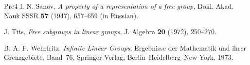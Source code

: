\documentclass{article}
\theoremstyle{definition}
\begin{document}
\begin{thebibliography}{Pre4}
I. N. Sanov,
\emph{A property of a representation of a free group},
Dokl. Akad. Nauk SSSR \textbf{57} (1947), 657--659 (in Russian).

J. Tits,
\emph{Free subgroups in linear groups},
J. Algebra \textbf{20} (1972), 250--270.

B. A. F. Wehrfritz,
\emph{Infinite Linear Groups},
Ergebnisse der Mathematik und ihrer Grenzgebiete, Band~76,
Springer-Verlag, Berlin--Heidelberg--New York, 1973.

\end{thebibliography}
\end{document}

